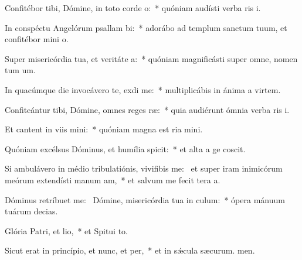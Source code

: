 \item Confitébor tibi, Dómine, in toto corde o:~* quóniam audísti verba ris i.
\item In conspéctu Angelórum psallam bi:~* adorábo ad templum sanctum tuum, et confitébor mini o.
\item Super misericórdia tua, et veritáte a:~* quóniam magnificásti super omne, nomen tum um.
\item In quacúmque die invocávero te, exdi me:~* multiplicábis in ánima a virtem.
\item Confiteántur tibi, Dómine, omnes reges ræ:~* quia audiérunt ómnia verba ris i.
\item Et cantent in viis mini:~* quóniam magna est ria mini.
\item Quóniam excélsus Dóminus, et humília spicit:~* et alta a ge coscit.
\item Si ambulávero in médio tribulatiónis, vivifibis me:~\pscross{} et super iram inimicórum meórum extendísti manum am,~* et salvum me fecit tera a.
\item Dóminus retríbuet  me:~\pscross{} Dómine, misericórdia tua in culum:~* ópera mánuum tuárum  decias.
\item Glória Patri, et lio,~* et Spitui to.
\item Sicut erat in princípio, et nunc, et per,~* et in sǽcula sæcurum. men.
